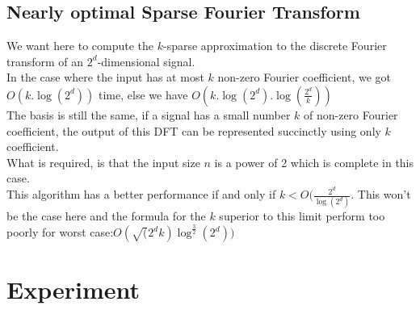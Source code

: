 \documentclass{article}
\begin{document}
\subsection{Nearly optimal Sparse Fourier Transform}

We want here to compute the $k$-sparse approximation to the discrete Fourier transform of an $2^d$-dimensional signal.\\
In the case where the input has at most $k$ non-zero Fourier coefficient, we got $O(k.\log(2^d))$ time, else we have $O(k.\log(2^d).\log(\frac{2^d}{k}))$\\
The basis is still the same, if a signal has a small number $k$ of non-zero Fourier coefficient, the output of this DFT can be represented succinctly using only $k$ coefficient.\\
What is required, is that the input size $n$ is a power of 2 which is complete in this case.\\
This algorithm has a better performance if and only if $ k < O(\frac{2^d}{\log(2^d)}$. This won't be the case here and the formula for the $k$ superior to this limit perform too poorly for worst case:$O(\sqrt(2^d k) \log^{\frac{3}{2}}(2^d))$


\section*{Experiment}
\end{document}
